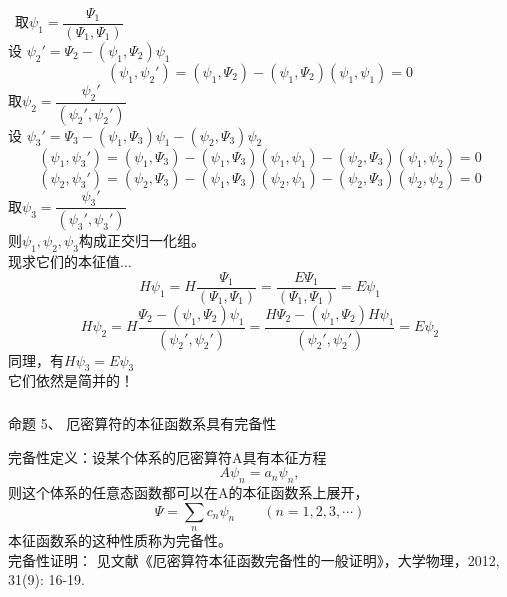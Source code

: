 \begin{frame} [allowframebreaks=]
    \frametitle{}
    \解~取$\psi_1=\dfrac{\Psi_1}{(\Psi_1, \Psi_1)}$\\
    设 $\psi_2'=\Psi_2-(\psi_1, \Psi_2)\psi_1$\\
    \begin{equation*}
        (\psi_1, \psi_2')=(\psi_1, \Psi_2)-(\psi_1, \Psi_2)(\psi_1, \psi_1)=0
    \end{equation*}  
    取$\psi_2=\dfrac{\psi_2'}{(\psi_2', \psi_2')}$\\
    设 $\psi_3'=\Psi_3-(\psi_1, \Psi_3)\psi_1-(\psi_2, \Psi_3)\psi_2$\\
    \begin{equation*}
        (\psi_1, \psi_3')=(\psi_1, \Psi_3)-(\psi_1, \Psi_3)(\psi_1, \psi_1)-(\psi_2, \Psi_3)(\psi_1, \psi_2)=0
    \end{equation*}
    \begin{equation*}
        (\psi_2, \psi_3')=(\psi_2, \Psi_3)-(\psi_1, \Psi_3)(\psi_2, \psi_1)-(\psi_2, \Psi_3)(\psi_2, \psi_2)=0
    \end{equation*}
    取$\psi_3=\dfrac{\psi_3'}{(\psi_3', \psi_3')}$\\ \vspace{0.6em}
    则$\psi_1, \psi_2, \psi_3$构成正交归一化组。\\ \vspace{0.6em}
    现求它们的本征值$\dots$\\
    $$ H\psi_1= H \dfrac{\Psi_1}{(\Psi_1, \Psi_1)} =  \dfrac{E\Psi_1}{(\Psi_1, \Psi_1)} = E \psi_1$$
    $$ H\psi_2= H \dfrac{\Psi_2-(\psi_1, \Psi_2)\psi_1}{(\psi_2', \psi_2')} =  \dfrac{H\Psi_2-(\psi_1, \Psi_2)H\psi_1}{(\psi_2', \psi_2')}=E\psi_2$$
    同理，有$ H\psi_3=E\psi_3$\\
    它们依然是简并的！
\end{frame} 

\begin{frame} [allowframebreaks=]
    \frametitle{}
    \begin{atcbox}{命题 5、}
        厄密算符的本征函数系具有完备性
     \end{atcbox}
    \alert{完备性定义：}设某个体系的厄密算符A具有本征方程
    \begin{equation*}
        A\psi_{n}=a_n\psi_{n}, 
    \end{equation*}  
    则这个体系的任意态函数都可以在A的本征函数系上展开，
    \begin{equation*}
        \Psi=\sum_n c_n \psi_{n} \qquad (n=1,2,3,\cdots)
    \end{equation*}
    本征函数系的这种性质称为完备性。\\
    完备性证明： 见文献《厄密算符本征函数完备性的一般证明》，大学物理，2012, 31(9): 16-19.
\end{frame} 

